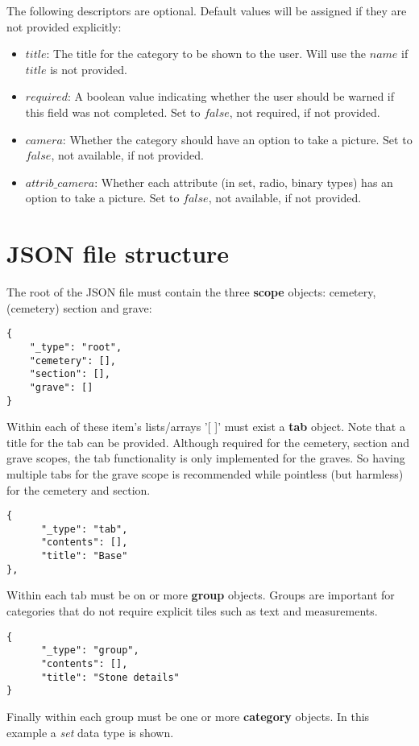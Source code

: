 \documentclass{scrreprt}
\begin{document}
The following descriptors are optional. Default values will be assigned if they are not provided explicitly:
\begin{itemize}
\item $title$: The title for the category to be shown to the user. Will use the $name$ if $title$ is not provided.
\item $required$: A boolean value indicating whether the user should be warned if this field was not completed. Set to $false$, not required, if not provided.
\item $camera$: Whether the category should have an option to take a picture. Set to $false$, not available, if not provided.
\item $attrib\_camera$: Whether each attribute (in set, radio, binary types) has an option to take a picture. Set to $false$, not available, if not provided.
\end{itemize}

\section{JSON file structure}
The root of the JSON file must contain the three \textbf{scope} objects: cemetery, (cemetery) section and grave:
\begin{verbatim}
{
    "_type": "root",
    "cemetery": [],
    "section": [],
    "grave": []
}
\end{verbatim}

Within each of these item's lists/arrays '[ ]' must exist a \textbf{tab} object. Note that a title for the tab can be provided. Although required for the cemetery, section and grave scopes, the tab functionality is only implemented for the graves. So having multiple tabs for the grave scope is recommended while pointless (but harmless) for the cemetery and section.
\begin{verbatim}
{
      "_type": "tab",
      "contents": [],
      "title": "Base"
},
\end{verbatim}

Within each tab must be on or more \textbf{group} objects. Groups are important for categories that do not require explicit tiles such as text and measurements.

\begin{verbatim}
{
      "_type": "group",
      "contents": [],
      "title": "Stone details"
}
\end{verbatim}

Finally within each group must be one or more \textbf{category} objects. In this example a \textit{set} data type is shown.
\end{document}

